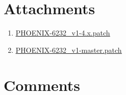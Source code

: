 \documentclass{report}%
\begin{document}
%
\section{Attachments}%
\label{sec:Attachments}%
\begin{enumerate}%
\item%
\href{https://issues.apache.org/jira/secure/attachment/13016278/PHOENIX-6232_v1-4.x.patch}{\underline{PHOENIX{-}6232\_v1{-}4.x.patch}}%
\item%
\href{https://issues.apache.org/jira/secure/attachment/13016332/PHOENIX-6232_v1-master.patch}{\underline{PHOENIX{-}6232\_v1{-}master.patch}}%
\end{enumerate}

%
\section{Comments}%
\label{sec:Comments}%
\end{document}
